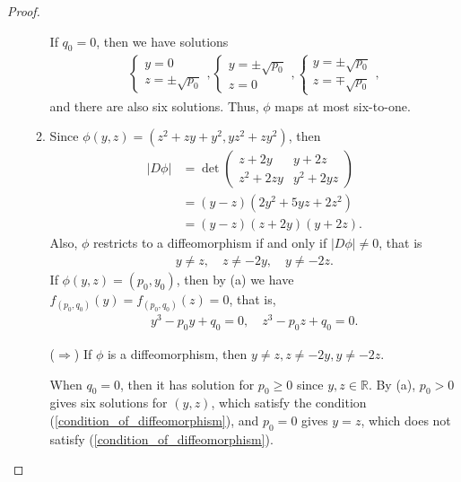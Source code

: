 \documentclass[11pt]{article}
\theoremstyle{definition}
\numberwithin{equation}{subsection}
\begin{document}
\begin{proof}
\begin{enumerate}[label=(\alph*)]
\begin{enumerate}[label=\arabic*)]
        If $q_0 = 0$, then we have solutions
        \begin{align*}
            \begin{cases}
                y = 0 \\
                z = \pm \sqrt{p_0}
            \end{cases}, 
            \begin{cases}
                y = \pm \sqrt{p_0} \\
                z = 0
            \end{cases},
            \begin{cases}
                y = \pm \sqrt{p_0} \\
                z = \mp \sqrt{p_0}
            \end{cases},
        \end{align*}
        and there are also six solutions. Thus, $\phi$ maps at most six-to-one.
        
        \item Since $\phi(y, z) = \left(z^2 + zy + y^2, yz^2 + zy^2\right)$, then 
        \begin{align*}
            |D\phi| & = \det \begin{pmatrix}
                z + 2y & y + 2z \\
                z^2 + 2zy & y^2 + 2yz
            \end{pmatrix} \\
            & = (y - z)\left(2y^2 + 5yz + 2z^2\right) \\
            & = (y - z)(z + 2y)(y + 2z).
        \end{align*}
        Also, $\phi$ restricts to a diffeomorphism if and only if $|D\phi| \neq 0$, that is 
        \begin{align}\label{condition_of_diffeomorphism}
            y \neq z, \quad z \neq -2y, \quad y \neq -2z.
        \end{align}
        If $\phi(y, z) = (p_0, y_0)$, then by (a) we have $f_{(p_0,q_0)}(y) = f_{(p_0,q_0)}(z) = 0$, that is, 
        \begin{align*}
            y^3 - p_0y + q_0 = 0, \quad z^3 - p_0z + q_0 = 0.
        \end{align*}
        
        ($\Rightarrow$) If $\phi$ is a diffeomorphism, then $y \neq z, z \neq -2y, y \neq -2z$. 
        
        When $q_0 = 0$, then it has solution for $p_0 \geq 0$ since $y, z \in \mathbb{R}$. By (a), $p_0 > 0$ gives six solutions for $(y,z)$, which satisfy the condition (\ref{condition_of_diffeomorphism}), and $p_0 = 0$ gives $y = z$, which does not satisfy (\ref{condition_of_diffeomorphism}).
        

\end{enumerate}
\end{enumerate}
\end{proof}
\end{document}
